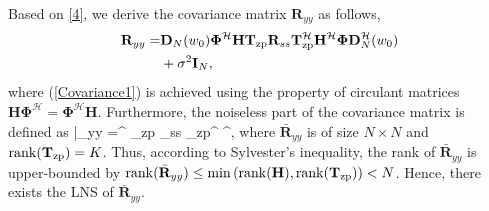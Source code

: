 \documentclass[journal]{IEEEtran}
\begin{document}
Based on \eqref{4}, we derive the covariance matrix $\mathbf{R}_{yy}$ as follows, 
\begin{align}
\mathbf{R}_{yy}%
= & \mathbf{D}_N(w_0)\mathbf{\Phi}^\mathcal{H}\mathbf{H} \mathbf{T}_{\rm zp}  \mathbf{R}_{ss} \mathbf{T}_{\rm zp}^\mathcal{H} \mathbf{H}^\mathcal{H}\mathbf{\Phi}\mathbf{D}_N^\mathcal{H}(w_0) \nonumber \\&  +  \sigma^2 \mathbf{I}_N, \label{Covariance1} %
\end{align}
where 
(\ref{Covariance1}) is achieved using the property of circulant matrices \( \mathbf{\mathbf{H}\Phi}^\mathcal{H}=\mathbf{\Phi}^\mathcal{H}\mathbf{H}\). %
Furthermore, the noiseless part of the covariance matrix is defined as
\beqa \label{covariance_b}
\bar{}_{yy} =\mathbf{\Phi}^ _{\rm zp}  _{ss} _{\rm zp}^ ^\mathbf{\Phi},
\enqa where $\bar{\mathbf{R}}_{yy}$ is of size $N \times N$ and ${\rm rank}(\mathbf{T}_{\rm zp}) = K$. Thus, according to Sylvester’s inequality, the rank of $\bar{\mathbf{R}}_{yy}$ is upper-bounded by \( {\rm rank}(\bar{\mathbf{R}}_{yy}) \le {\rm min}\left({\rm rank}({\mathbf{H}}),{\rm rank}(\mathbf{T}_{\rm zp}) \right) < N\). Hence, there exists the LNS of $\bar{\mathbf{R}}_{yy}$. 

\end{document}

